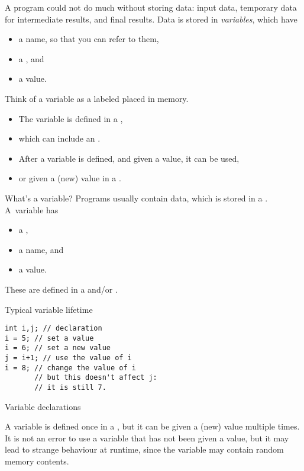 A program could not do much without storing data: input data,
temporary data for intermediate results, and final results.
Data is stored in \emph{variables},  which have
\begin{itemize}
\item a name, so that you can refer to them,
\item a , and
\item a value.
\end{itemize}
Think of a variable as a labeled placed in memory.
\begin{itemize}
\item The variable is defined in a
  ,
\item which can include an .
\item After a variable is defined, and given a value, it can be used,
\item or given a (new) value in a .
\end{itemize}

\begin{slide}{What's a variable?}
  \label{sl:declaration}
  Programs usually contain data, which is stored in a
  . A~variable has
  \begin{itemize}
  \item a ,
  \item a name, and
  \item a value.
  \end{itemize}
  These are defined in a  and/or
  .
\end{slide}

\begin{block}{Typical variable lifetime}
  \label{sl:varlife}
\begin{lstlisting}
int i,j; // declaration
i = 5; // set a value
i = 6; // set a new value
j = i+1; // use the value of i
i = 8; // change the value of i
       // but this doesn't affect j:
       // it is still 7.
\end{lstlisting}
\end{block}

 {Variable declarations}

A variable is defined once
in a ,
but it can be given a (new) value multiple
times. It is not an error to use a variable that has not been given a
value, but it may lead to strange behaviour at runtime, since the
variable may contain random memory contents.


